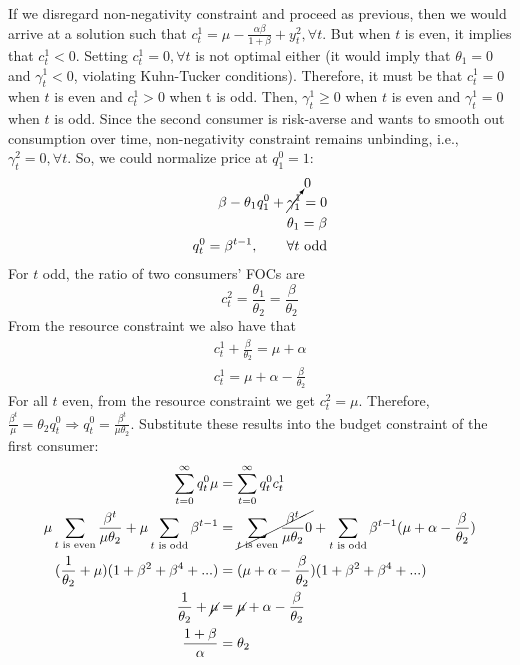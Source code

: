 \documentclass[]{article}
\begin{document}
If we disregard non-negativity constraint and proceed as previous, then we would arrive at a solution such that $c_t^1 = \mu - \frac{\alpha\beta}{1 + \beta} + y_t^2, \forall t$. But when $t$ is even, it implies that $c_t^1 < 0$. Setting $c_t^1 = 0, \forall t$ is not optimal either (it would imply that $\theta_1 = 0$ and $\gamma_t^1 < 0$, violating Kuhn-Tucker conditions). Therefore, it must be that $c_t^1 = 0$ when $t$ is even and $c_t^1 > 0$ when t is odd. Then, $\gamma_t^1\geq0$ when $t$ is even and $\gamma_t^1 = 0$ when $t$ is odd. Since the second consumer is risk-averse and wants to smooth out consumption over time, non-negativity constraint remains unbinding, i.e., $\gamma_t^2 = 0, \forall t$. So, we could normalize price at $q_1^0 = 1$:
\begin{equation}
	\begin{split}
		\beta - \theta_1q_1^0 + \cancelto{0}{\gamma_1^1} = 0 \\ \nonumber
		\theta_1 = \beta \\
		q_t^0 = \beta^{t-1},  \qquad\forall t\text{ odd}
	\end{split}
\end{equation}
For $t$ odd, the ratio of two consumers' FOCs are
\begin{equation}
	c_t^2 = \frac{\theta_1}{\theta_2} = \frac{\beta}{\theta_2} \nonumber
\end{equation}
From the resource constraint we also have that 
\begin{equation}
	\begin{split}
		c_t^1 + \frac{\beta}{\theta_2} = \mu + \alpha \\ \nonumber
		c_t^1 = \mu + \alpha - \frac{\beta}{\theta_2}
	\end{split}
\end{equation}
For all $t$ even, from the resource constraint we get $c_t^2 = \mu$. Therefore, $\frac{\beta^t}{\mu} = \theta_2q_t^0 \Longrightarrow q_t^0 = \frac{\beta^t}{\mu\theta_2}$.
Substitute these results into the budget constraint of the first consumer:
\begin{equation}
	\begin{split}
		 \sum\limits_{t = 0}^\infty q_t^0\mu& = \sum\limits_{t = 0}^\infty q_t^0c_t^1 \\ \nonumber
		 \mu\sum\limits_{t\text{ is even}} \frac{\beta^t}{\mu\theta_2} + \mu\sum\limits_{t\text{ is odd}}\beta^{t-1}& = \cancel{\sum\limits_{t\text{ is even}} \frac{\beta^t}{\mu\theta_2}0} + \sum\limits_{t\text{ is odd}}\beta^{t-1}(\mu + \alpha - \frac{\beta}{\theta_2}) \\
		 (\frac{1}{\theta_2} + \mu)(1 + \beta^2 + \beta^4 + ...)& = (\mu + \alpha - \frac{\beta}{\theta_2})(1 + \beta^2 + \beta^4 + ...) \\
		 \frac{1}{\theta_2} + \cancel{\mu}& = \cancel{\mu} + \alpha - \frac{\beta}{\theta_2} \\
		 \frac{1 + \beta}{\alpha}& = \theta_2
	\end{split}
\end{equation}
\end{document}
